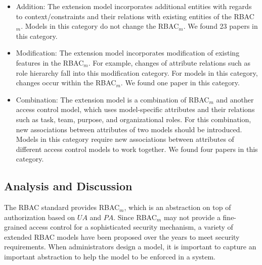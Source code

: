 \begin{itemize}
	\item Addition: The extension model incorporates additional entities with regards to context/constraints and their relations with existing entities of the RBAC$_{m}$. Models in this category do not change the RBAC$_{m}$. We found 23 papers in this category.
	\item Modification: The extension model incorporates modification of existing features in the RBAC$_{m}$. For example, changes of attribute relations such as role hierarchy fall into this modification category. For models in this category, changes occur within the RBAC$_{m}$. We found one paper in this category.
	\item Combination: The extension model is a combination of RBAC$_{m}$ and another access control model, which uses model-specific attributes and their relations such as task, team, purpose, and organizational roles. For this combination, new associations between attributes of two models should be introduced. Models in this category require new associations between attributes of different access control models to work together. We found four papers in this category.
\end{itemize}

%
%
%

\subsection{Analysis and Discussion}

The RBAC standard provides RBAC$_{m}$, which is an abstraction on top of authorization based on $UA$ and $PA$. Since RBAC$_{m}$ may not provide a fine-grained access control for a sophisticated
security mechanism, a variety of extended RBAC models have been proposed over the years to meet
security requirements. When administrators design a model, it is important to capture an important abstraction to help the model to be enforced in a system.

